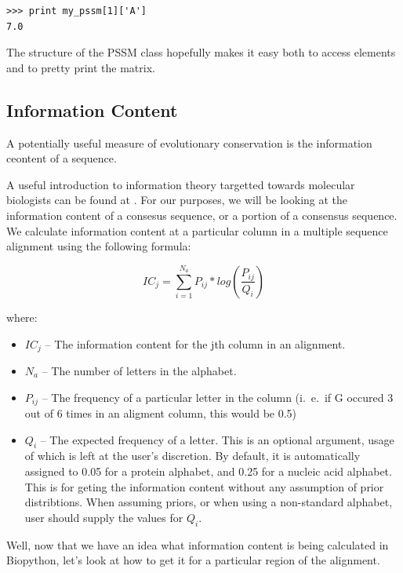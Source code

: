 \documentclass{report}
\begin{document}
\begin{verbatim}
>>> print my_pssm[1]['A']
7.0
\end{verbatim}

The structure of the PSSM class hopefully makes it easy both to access elements and to pretty print the matrix.

\subsection{Information Content}
\label{sec:getting_info_content}

A potentially useful measure of evolutionary conservation is the information ceontent of a sequence.


A useful introduction to information theory targetted towards molecular biologists can be found at . For our purposes, we will be looking at the information content of a consesus sequence, or a portion of a consensus sequence. We calculate information content at a particular column in a multiple sequence alignment using the following formula:

\begin{displaymath}
IC_{j} = \sum_{i=1}^{N_{a}} P_{ij} * log(\frac{P_{ij}}{Q_{i}}) 
\end{displaymath}

where:

\begin{itemize}
  \item $IC_{j}$ -- The information content for the jth column in an alignment.
  \item $N_{a}$ -- The number of letters in the alphabet.
  \item $P_{ij}$ -- The frequency of a particular letter in the column (i.~e.~if G occured 3 out of 6 times in an aligment column, this would be 0.5)
  \item $Q_{i}$ --  The expected frequency of a letter. This is an
  optional argument, usage of which is left at the user's
  discretion. By default, it is automatically assigned to 0.05 for a
  protein alphabet, and 0.25 for a nucleic acid alphabet. This is for
  geting the information content without any assumption of prior
  distribtions. When assuming priors, or when using a non-standard
  alphabet, user should supply the values for $Q_{i}$. 
\end{itemize}

Well, now that we have an idea what information content is being calculated in Biopython, let's look at how to get it for a particular region of the alignment.
\end{document}
